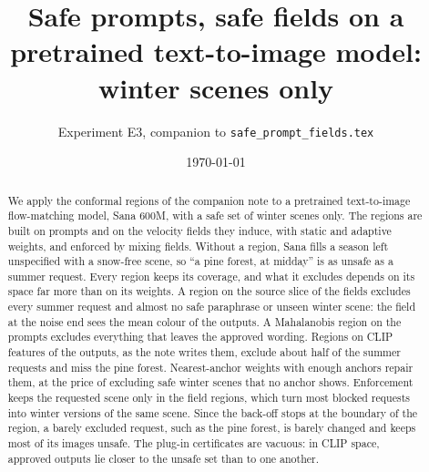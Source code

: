 \documentclass{article}
\title{Safe prompts, safe fields on a pretrained text-to-image model:\\[3pt]
\large winter scenes only}
\author{Experiment E3, companion to \texttt{safe\_prompt\_fields.tex}}
\date{\today}
\begin{document}
\maketitle

\begin{abstract}
We apply the conformal regions of the companion note to a pretrained text-to-image flow-matching model, Sana 600M, with a safe set
of winter scenes only. The regions are built on prompts and on the velocity fields they induce, with static and adaptive weights,
and enforced by mixing fields. Without a region, Sana fills a season left unspecified with a snow-free scene, so ``a pine forest, at
midday'' is as unsafe as a summer request. Every region keeps its coverage, and what it excludes depends on its space far more than
on its weights. A region on the source slice of the fields excludes every summer request and almost no safe paraphrase or unseen
winter scene: the field at the noise end sees the mean colour of the outputs. A Mahalanobis region on the prompts excludes
everything that leaves the approved wording. Regions on CLIP features of the outputs, as the note writes them, exclude about half
of the summer requests and miss the pine forest. Nearest-anchor weights with enough anchors repair them, at the price of excluding
safe winter scenes that no anchor shows. Enforcement keeps the requested scene only in the field regions, which turn most blocked
requests into winter versions of the same scene. Since the back-off stops at the boundary of the region, a barely excluded request,
such as the pine forest, is barely changed and keeps most of its images unsafe. The plug-in certificates are vacuous: in CLIP
space, approved outputs lie closer to the unsafe set than to one another.
\end{abstract}

\end{document}
